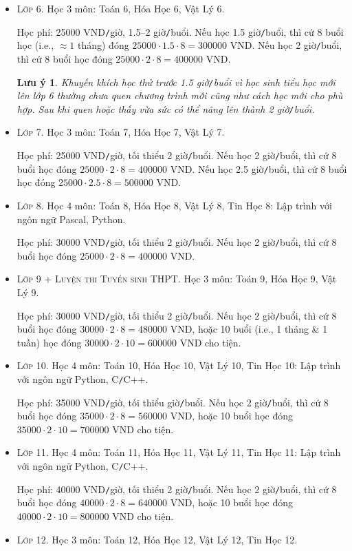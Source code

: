 \documentclass{article}
\numberwithin{equation}{section}
\newtheorem{luuy}{Lưu ý}
\begin{document}
\begin{itemize}\itemsep0em
	\item \textsc{Lớp 6.} Học 3 môn: Toán 6, Hóa Học 6, Vật Lý 6.
	
	{\sf Học phí:} 25000 VND{\tt/}giờ, 1.5--2 giờ{\tt/}buổi. Nếu học 1.5 giờ{\tt/}buổi, thì cứ 8 buổi học (i.e., $\approx1$ tháng) đóng $25000\cdot1.5\cdot8 = 300000$ VND. Nếu học 2 giờ{\tt/}buổi, thì cứ 8 buổi học đóng $25000\cdot2\cdot8 = 400000$ VND.
	
	\begin{luuy}
		Khuyến khích học thử trước 1.5 giờ{\tt/}buổi vì học sinh tiểu học mới lên lớp 6 thường chưa quen chương trình mới cũng như cách học mới cho phù hợp. Sau khi quen hoặc thấy vừa sức có thể nâng lên thành 2 giờ{\tt/}buổi.
	\end{luuy}
	\item \textsc{Lớp 7.} Học 3 môn: Toán 7, Hóa Học 7, Vật Lý 7.
	
	{\sf Học phí:} 25000 VND{\tt/}giờ, tối thiểu 2 giờ{\tt/}buổi. Nếu học 2 giờ{\tt/}buổi, thì cứ 8 buổi học đóng $25000\cdot2\cdot8 = 400000$ VND. Nếu học 2.5 giờ{\tt/}buổi, thì cứ 8 buổi học đóng $25000\cdot2.5\cdot8 = 500000$ VND. 
	\item \textsc{Lớp 8.} Học 4 môn: Toán 8, Hóa Học 8, Vật Lý 8, Tin Học 8: Lập trình với ngôn ngữ Pascal, Python.
	
	{\sf Học phí:} 30000 VND{\tt/}giờ, tối thiểu 2 giờ{\tt/}buổi. Nếu học 2 giờ{\tt/}buổi, thì cứ 8 buổi học đóng $25000\cdot2\cdot8 = 400000$ VND.
	\item \textsc{Lớp 9 $+$ Luyện thi Tuyển sinh THPT.} Học 3 môn: Toán 9, Hóa Học 9, Vật Lý 9.
	
	{\sf Học phí:} 30000 VND{\tt/}giờ, tối thiểu 2 giờ{\tt/}buổi. Nếu học 2 giờ{\tt/}buổi, thì cứ 8 buổi học đóng $30000\cdot2\cdot8 = 480000$ VND, hoặc 10 buổi (i.e., 1 tháng \& 1 tuần) học đóng $30000\cdot2\cdot10 = 600000$ VND cho tiện.
	\item \textsc{Lớp 10.} Học 4 môn: Toán 10, Hóa Học 10, Vật Lý 10, Tin Học 10: Lập trình với ngôn ngữ Python, C{\tt/}C++.
	
	{\sf Học phí:} 35000 VND{\tt/}giờ, tối thiểu giờ{\tt/}buổi. Nếu học 2 giờ{\tt/}buổi, thì cứ 8 buổi học đóng $35000\cdot2\cdot8 = 560000$ VND, hoặc 10 buổi học đóng $35000\cdot2\cdot10 = 700000$ VND cho tiện.
	\item \textsc{Lớp 11.} Học 4 môn: Toán 11, Hóa Học 11, Vật Lý 11, Tin Học 11: Lập trình với ngôn ngữ Python, C{\tt/}C++.
	
	{\sf Học phí:} 40000 VND{\tt/}giờ, tối thiểu 2 giờ{\tt/}buổi. Nếu học 2 giờ{\tt/}buổi, thì cứ 8 buổi học đóng $40000\cdot2\cdot8 = 640000$ VND, hoặc 10 buổi học đóng $40000\cdot2\cdot10 = 800000$ VND cho tiện.
	\item \textsc{Lớp 12.} Học 3 môn: Toán 12, Hóa Học 12, Vật Lý 12, Tin Học 12.
	

\end{itemize}
\end{document}
